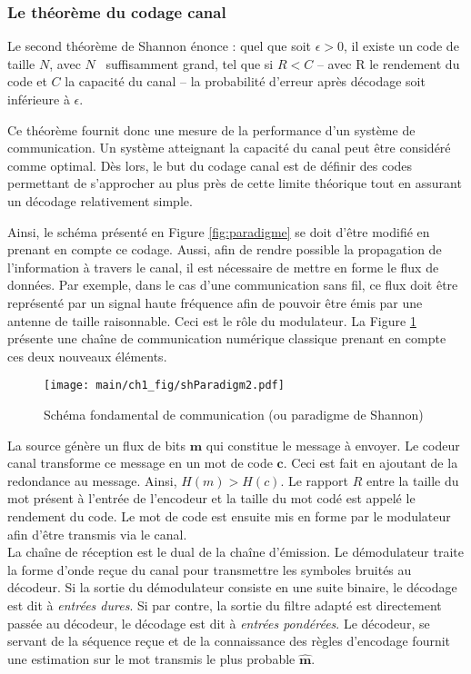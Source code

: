 \subsubsection{Le théorème du codage canal}
Le second théorème de Shannon énonce : quel que soit $\epsilon > 0$, il existe un code de taille $N$, avec $N$ \
suffisamment grand, tel que si $R<C$ -- avec R le rendement du code et $C$ la capacité du canal -- la probabilité
d'erreur après décodage soit inférieure à $\epsilon$. 

Ce théorème fournit donc une mesure de la performance d'un système de communication. Un système atteignant la capacité 
du canal peut être considéré comme optimal. Dès lors, le but du codage canal est de définir des codes permettant de 
s'approcher au plus près de cette limite théorique tout en assurant un décodage relativement simple.

Ainsi, le schéma présenté en Figure \ref{fig:paradigme} se doit d'être modifié en prenant en compte ce codage. Aussi,
afin de rendre possible la propagation de l'information à travers le canal, il est nécessaire de mettre en forme le flux 
de données. Par exemple, dans le cas d'une communication sans fil, ce flux doit être représenté par un signal haute 
fréquence afin de pouvoir être émis par une antenne de taille raisonnable. Ceci est le rôle du modulateur.
La Figure \ref{fig:paradigme2} présente une chaîne de communication numérique classique prenant en compte ces deux
nouveaux éléments.
\begin{figure}[!h]
	\centering
	\texttt{[image: main/ch1\_fig/shParadigm2.pdf]}
	\caption{\label{fig:paradigme2} Schéma fondamental de communication (ou paradigme de Shannon)}
\end{figure}

La source génère un flux de bits $\mathbf{m}$ qui constitue le message à envoyer. Le codeur canal transforme ce message 
en un mot de code $\mathbf{c}$. Ceci est fait en ajoutant de la redondance au message. Ainsi, $H(m)>H(c)$. Le rapport $R$
entre la taille du mot présent à l'entrée de l'encodeur et la taille du mot codé est appelé le rendement du code. Le mot 
de code est ensuite mis en forme par le modulateur afin d'être transmis via le canal.\\
La chaîne de réception est le dual de la chaîne d’émission. Le démodulateur traite la forme d'onde reçue du canal 
pour transmettre les symboles bruités au décodeur. Si la sortie du démodulateur consiste en une suite binaire, le 
décodage est dit à \emph{entrées dures}. Si par contre, la sortie du filtre adapté est directement passée au décodeur, 
le décodage est dit à \emph{entrées pondérées}. Le décodeur, se servant de la séquence reçue et de la connaissance des règles 
d'encodage fournit une estimation sur le  mot transmis le plus probable $\mathbf{\hat{m}}$.


